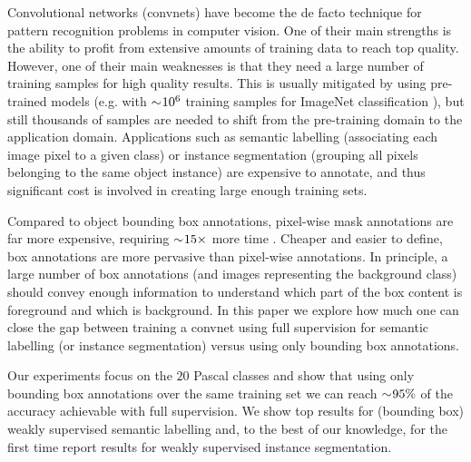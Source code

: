 \documentclass[10pt,english,british,twocolumn]{article}
\begin{document}
Convolutional networks (convnets) have become the de facto technique
for pattern recognition problems in computer vision. One of their
main strengths is the ability to profit from extensive amounts of
training data to reach top quality. However, one of their main weaknesses
is that they need a large number of training samples for high quality
results. This is usually mitigated by using pre-trained models (e.g.
with $\sim\negmedspace10^{6}$ training samples for ImageNet classification
\cite{Russakovsky2015Ijcv}), but still thousands of samples are needed
to shift from the pre-training domain to the application domain. Applications
such as semantic labelling (associating each image pixel to a given
class) or instance segmentation (grouping all pixels belonging to
the same object instance) are expensive to annotate, and thus significant
cost is involved in creating large enough training sets.

Compared to object bounding box annotations, pixel-wise mask annotations
are far more expensive, requiring $\sim\negmedspace15\times$ more
time \cite{Lin2014EccvCoco}. Cheaper and easier to define, box annotations
are more pervasive than pixel-wise annotations. In principle, a large
number of box annotations (and images representing the background
class) should convey enough information to understand which part of
the box content is foreground and which is background. In this paper
we explore how much one can close the gap between training a convnet
using full supervision for semantic labelling (or instance segmentation)
versus using only bounding box annotations.

Our experiments focus on the $20$ Pascal classes \cite{Everingham15}
and show that using only bounding box annotations over the same training
set we can reach $\sim\negmedspace95\%$ of the accuracy achievable
with full supervision. We show top results for (bounding box) weakly
supervised semantic labelling and, to the best of our knowledge, for
the first time report results for weakly supervised instance segmentation.
\end{document}
